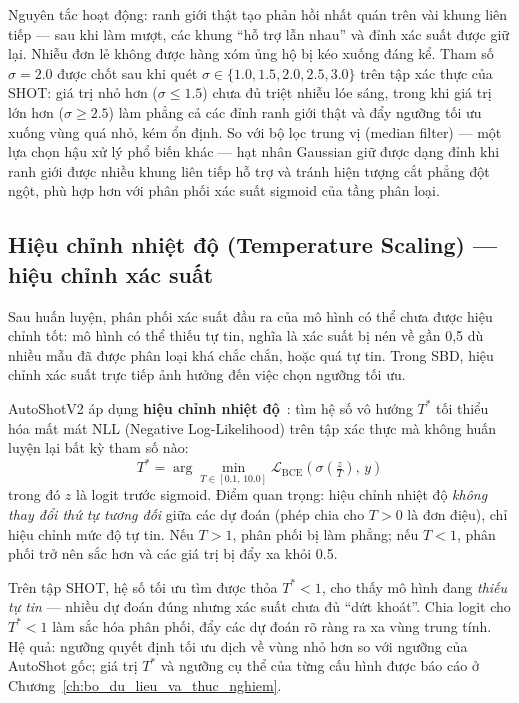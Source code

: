 Nguyên tắc hoạt động: ranh giới thật tạo phản hồi nhất quán trên vài khung liên tiếp --- sau khi làm mượt, các khung ``hỗ trợ lẫn nhau'' và đỉnh xác suất được giữ lại. Nhiễu đơn lẻ không được hàng xóm ủng hộ bị kéo xuống đáng kể. Tham số $\sigma = 2.0$ được chốt sau khi quét $\sigma \in \{1.0, 1.5, 2.0, 2.5, 3.0\}$ trên tập xác thực của SHOT: giá trị nhỏ hơn ($\sigma \le 1.5$) chưa đủ triệt nhiễu lóe sáng, trong khi giá trị lớn hơn ($\sigma \ge 2.5$) làm phẳng cả các đỉnh ranh giới thật và đẩy ngưỡng tối ưu xuống vùng quá nhỏ, kém ổn định. So với bộ lọc trung vị (median filter) --- một lựa chọn hậu xử lý phổ biến khác --- hạt nhân Gaussian giữ được dạng đỉnh khi ranh giới được nhiều khung liên tiếp hỗ trợ và tránh hiện tượng cắt phẳng đột ngột, phù hợp hơn với phân phối xác suất sigmoid của tầng phân loại.

\subsection{Hiệu chỉnh nhiệt độ (Temperature Scaling) --- hiệu chỉnh xác suất}
\label{subsec:v2_temperature}

Sau huấn luyện, phân phối xác suất đầu ra của mô hình có thể chưa được hiệu chỉnh tốt: mô hình có thể thiếu tự tin, nghĩa là xác suất bị nén về gần 0,5 dù nhiều mẫu đã được phân loại khá chắc chắn, hoặc quá tự tin. Trong SBD, hiệu chỉnh xác suất trực tiếp ảnh hưởng đến việc chọn ngưỡng tối ưu.

AutoShotV2 áp dụng \textbf{hiệu chỉnh nhiệt độ}~\cite{Guo2017Calibration}: tìm hệ số vô hướng $T^*$ tối thiểu hóa mất mát NLL (Negative Log-Likelihood) trên tập xác thực mà không huấn luyện lại bất kỳ tham số nào:
\begin{equation}
    T^* = \arg\min_{T \in [0.1,\,10.0]} \mathcal{L}_{\text{BCE}}\!\left(\sigma\!\left(\tfrac{z}{T}\right),\,y\right)
    \label{eq:temperature_scaling}
\end{equation}
trong đó $z$ là logit trước sigmoid. Điểm quan trọng: hiệu chỉnh nhiệt độ \textit{không thay đổi thứ tự tương đối} giữa các dự đoán (phép chia cho $T > 0$ là đơn điệu), chỉ hiệu chỉnh mức độ tự tin. Nếu $T > 1$, phân phối bị làm phẳng; nếu $T < 1$, phân phối trở nên sắc hơn và các giá trị bị đẩy xa khỏi 0.5.

Trên tập SHOT, hệ số tối ưu tìm được thỏa $T^* < 1$, cho thấy mô hình đang \textit{thiếu tự tin} --- nhiều dự đoán đúng nhưng xác suất chưa đủ ``dứt khoát''. Chia logit cho $T^* < 1$ làm sắc hóa phân phối, đẩy các dự đoán rõ ràng ra xa vùng trung tính. Hệ quả: ngưỡng quyết định tối ưu dịch về vùng nhỏ hơn so với ngưỡng của AutoShot gốc; giá trị $T^*$ và ngưỡng cụ thể của từng cấu hình được báo cáo ở Chương~\ref{ch:bo_du_lieu_va_thuc_nghiem}.

